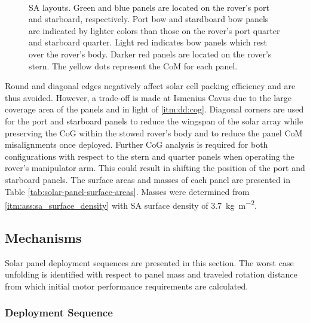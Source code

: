 \begin{figure}[h]
\begin{subfigure}[t]{\subfigureWidth}
		\label{fig:sub:solar-array-layouts-for-ismenius-cavus}
	\end{subfigure}\\[0.8ex]
    \caption[Solar array layouts]
            {\ac{SA} layouts. Green and blue panels are located on the rover's port and starboard, respectively. Port bow and stardboard bow panels are indicated by lighter colors than those on the rover's port quarter and starboard quarter. Light red indicates bow panels which rest over the rover's body. Darker red panels are located on the rover's stern. The yellow dots represent the \ac{CoM} for each panel.}
    \label{fig:solar-array-layouts-for-missions-sites}
\vspace{-2ex}
\end{figure}

\vspace{0.5cm}

Round and diagonal edges negatively affect solar cell packing efficiency and are thus avoided. However, a trade-off is made at Ismenius Cavus due to the large coverage area of the panels and in light of \ref{itm:dd:cog}. Diagonal corners are used for the port and starboard panels to reduce the wingspan of the solar array while preserving the \ac{CoG} within the stowed rover's body and to reduce the panel \ac{CoM} misalignments once deployed. Further \ac{CoG} analysis is required for both configurations with respect to the stern and quarter panels when operating the rover's manipulator arm. This could result in shifting the position of the port and starboard panels. The surface areas and masses of each panel are presented in Table \ref{tab:solar-panel-surface-areas}. Masses were determined from \ref{itm:ass:sa_surface_density} with \ac{SA} surface density of \SI{3.7}{kg.m^{-2}}.

\vspace{0.5cm}




\clearpage
\subsection{Mechanisms}
Solar panel deployment sequences are presented in this section. The worst case unfolding is identified with respect to panel mass and traveled rotation distance from which initial motor performance requirements are calculated.

\subsubsection{Deployment Sequence}

